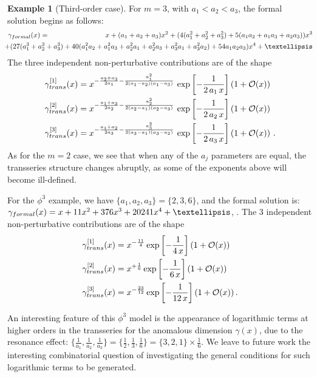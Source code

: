 \documentclass[oneside]{amsart}
\theoremstyle{definition}
\newtheorem{example}[thm]{Example}
\newcommand{\bigO}{\mathcal{O}}
\begin{document}
\begin{example}[Third-order case] For $m=3$, with $a_1<a_2<a_3$, the formal solution begins as follows:
\begin{eqnarray} \gamma_{\rm formal}(x)&=& x +(a_1+a_2+a_3) x^2 +(4(a_1^2+a_2^2+a_3^2)+5 (a_1 a_2+a_1 a_3+a_2 a_3)) x^3 \nonumber\\
 &&\hskip -2.5cm +(27(a_1^3+a_2^3+a_3^3)+40(a_1^2 a_2+a_1^2 a_3+a_2^2 a_1+a_2^2 a_3 +a_3^2 a_1+a_3^2 a_2)+54 a_1 a_2 a_3) x^4 +\dots \nonumber \end{eqnarray}
The three independent  non-perturbative contributions are of the shape
\begin{align*} \gamma_{\rm trans}^{[1]}(x) &= x^{-\frac{a_2+a_3}{2a_1}-\frac{a_1^2}{2(a_1-a_2)(a_1-a_3)}}\, \exp\left[-\frac{1}{2\,a_1\, x}\right] \left(1+\bigO(x)\right) \\
\gamma_{\rm trans}^{[2]}(x) &= x^{-\frac{a_1+a_3}{2a_2}-\frac{a_2^2}{2(a_2-a_1)(a_2-a_3)}}\, \exp\left[-\frac{1}{2\,a_2\, x}\right] \left(1+\bigO(x)\right) \\
 \gamma_{\rm trans}^{[3]}(x) &= x^{-\frac{a_1+a_2}{2a_3}-\frac{a_3^2}{2(a_3-a_1)(a_3-a_2)}}\, \exp\left[-\frac{1}{2\,a_3\, x}\right] \left(1+\bigO(x)\right)\,. \end{align*}
As for the $m=2$ case, we see that when any of the $a_j$ parameters are equal, the transseries structure changes abruptly, as some of the exponents above will become ill-defined. %

For the $\phi^3$ example, we have $\{a_1, a_2, a_3\}=\{2, 3, 6\}$, and the formal solution is: $\gamma_{\rm formal}(x)= x+11x^2 +376x^3+20241 x^4+ \dots$, 
\cite[\href{https://oeis.org/A051862}{A051862}]{oeis}. The 3 independent non-perturbative contributions are of the shape \cite{BDM}
\begin{align*} \gamma_{\rm trans}^{[1]}(x) &= x^{-\frac{11}{4}} \exp\left[-\frac{1}{4\, x}\right] \left(1+\bigO(x)\right) \\
\gamma_{\rm trans}^{[2]}(x) &= x^{+\frac{1}{6}} \exp\left[-\frac{1}{6\, x}\right] \left(1+\bigO(x)\right) \\
 \gamma_{\rm trans}^{[3]}(x) &= x^{-\frac{23}{12}} \exp\left[-\frac{1}{12\, x}\right] \left(1+\bigO(x)\right). \end{align*}
%
\end{example}
An interesting feature of this $\phi^3$ model is the appearance of logarithmic terms \cite{BDM,BB} at higher orders in the transseries for the anomalous dimension $\gamma(x)$, due to the resonance effect: $\{\frac{1}{a_1}, \frac{1}{a_2}, \frac{1}{a_3}\}=\{\frac{1}{2}, \frac{1}{3}, \frac{1}{6}\}=\{3, 2, 1\}\times \frac{1}{6}$. We leave to future work the interesting combinatorial question of investigating the general conditions for such logarithmic terms to be generated. 
\end{document}
